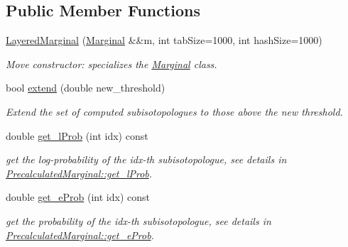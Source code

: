 \subsection*{Public Member Functions}
\begin{DoxyCompactItemize}
\item 
\mbox{\hyperlink{class_iso_spec_1_1_layered_marginal_af062d180664c9c856b4cc72e3457ca9d}{Layered\+Marginal}} (\mbox{\hyperlink{class_iso_spec_1_1_marginal}{Marginal}} \&\&m, int tab\+Size=1000, int hash\+Size=1000)
\begin{DoxyCompactList}\small\item\em Move constructor\+: specializes the \mbox{\hyperlink{class_iso_spec_1_1_marginal}{Marginal}} class. \end{DoxyCompactList}\item 
bool \mbox{\hyperlink{class_iso_spec_1_1_layered_marginal_ab8b66ed79bad27183f98a9ae34c3b944}{extend}} (double new\+\_\+threshold)
\begin{DoxyCompactList}\small\item\em Extend the set of computed subisotopologues to those above the new threshold. \end{DoxyCompactList}\item 
\mbox{\label{class_iso_spec_1_1_layered_marginal_aec04c0f0e00a24d151be39ab46267b4c}} 
double \mbox{\hyperlink{class_iso_spec_1_1_layered_marginal_aec04c0f0e00a24d151be39ab46267b4c}{get\+\_\+l\+Prob}} (int idx) const
\begin{DoxyCompactList}\small\item\em get the log-\/probability of the idx-\/th subisotopologue, see details in \mbox{\hyperlink{class_iso_spec_1_1_precalculated_marginal_a07eee6d60635c9c1d6f92c181994e06a}{Precalculated\+Marginal\+::get\+\_\+l\+Prob}}. \end{DoxyCompactList}\item 
\mbox{\label{class_iso_spec_1_1_layered_marginal_a3c0a5ce02f00680fc67211c66761e887}} 
double \mbox{\hyperlink{class_iso_spec_1_1_layered_marginal_a3c0a5ce02f00680fc67211c66761e887}{get\+\_\+e\+Prob}} (int idx) const
\begin{DoxyCompactList}\small\item\em get the probability of the idx-\/th subisotopologue, see details in \mbox{\hyperlink{class_iso_spec_1_1_precalculated_marginal_a7a38a567eadf16fa2ad41e81c8f55c02}{Precalculated\+Marginal\+::get\+\_\+e\+Prob}}. \end{DoxyCompactList}\item 

\end{DoxyCompactItemize}
